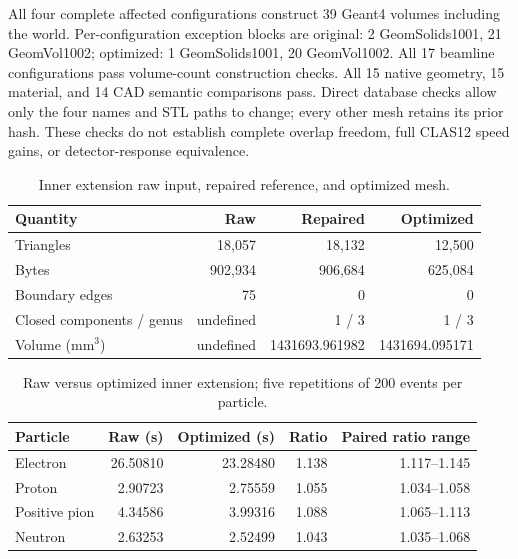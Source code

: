 All four complete affected configurations construct 39 Geant4 volumes including the world. Per-configuration
exception blocks are original: 2 GeomSolids1001, 21 GeomVol1002; optimized: 1 GeomSolids1001, 20 GeomVol1002.
All 17 beamline configurations pass volume-count construction checks. All 15 native geometry, 15 material, and
14 CAD semantic comparisons pass. Direct database checks allow only the four names and STL paths to change;
every other mesh retains its prior hash. These checks do not establish complete overlap freedom, full CLAS12
speed gains, or detector-response equivalence.

\begin{table}[htbp]
\centering
\caption{Inner extension raw input, repaired reference, and optimized mesh.}
\label{tab:extension-inner-mesh}
\setlength{\tabcolsep}{5pt}
\begin{tabular}{lrrr}
\toprule
Quantity & Raw & Repaired & Optimized \\
\midrule
Triangles & 18,057 & 18,132 & 12,500 \\
Bytes & 902,934 & 906,684 & 625,084 \\
Boundary edges & 75 & 0 & 0 \\
Closed components / genus & undefined & 1 / 3 & 1 / 3 \\
Volume (mm$^3$) & undefined & 1431693.961982 & 1431694.095171 \\
\bottomrule
\end{tabular}
\end{table}

\begin{table}[htbp]
\centering
\caption{Raw versus optimized inner extension; five repetitions of 200 events per particle.}
\label{tab:extension-inner-upgrade}
\setlength{\tabcolsep}{5pt}
\begin{tabular}{lrrrr}
\toprule
Particle & Raw (s) & Optimized (s) & Ratio & Paired ratio range \\
\midrule
Electron & 26.50810 & 23.28480 & 1.138 & 1.117--1.145 \\
Proton & 2.90723 & 2.75559 & 1.055 & 1.034--1.058 \\
Positive pion & 4.34586 & 3.99316 & 1.088 & 1.065--1.113 \\
Neutron & 2.63253 & 2.52499 & 1.043 & 1.035--1.068 \\
\bottomrule
\end{tabular}
\end{table}

